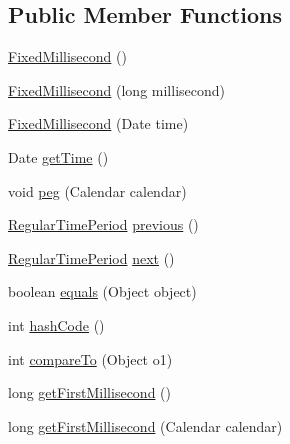 \subsection*{Public Member Functions}
\begin{DoxyCompactItemize}
\item 
\mbox{\hyperlink{classorg_1_1jfree_1_1data_1_1time_1_1_fixed_millisecond_ac6383e5e9eefae4117c7494fbae0b683}{Fixed\+Millisecond}} ()
\item 
\mbox{\hyperlink{classorg_1_1jfree_1_1data_1_1time_1_1_fixed_millisecond_a257d2702a0405b699a03fb473f376368}{Fixed\+Millisecond}} (long millisecond)
\item 
\mbox{\hyperlink{classorg_1_1jfree_1_1data_1_1time_1_1_fixed_millisecond_a495efb60f07c2761879dbc673e6a39ee}{Fixed\+Millisecond}} (Date time)
\item 
Date \mbox{\hyperlink{classorg_1_1jfree_1_1data_1_1time_1_1_fixed_millisecond_ab90c14e18854d7d1ea40db4fa6e84e42}{get\+Time}} ()
\item 
void \mbox{\hyperlink{classorg_1_1jfree_1_1data_1_1time_1_1_fixed_millisecond_a029f40d75617f862fdb9af8da5698fa3}{peg}} (Calendar calendar)
\item 
\mbox{\hyperlink{classorg_1_1jfree_1_1data_1_1time_1_1_regular_time_period}{Regular\+Time\+Period}} \mbox{\hyperlink{classorg_1_1jfree_1_1data_1_1time_1_1_fixed_millisecond_a39a4a14f44468b325929061c832a3844}{previous}} ()
\item 
\mbox{\hyperlink{classorg_1_1jfree_1_1data_1_1time_1_1_regular_time_period}{Regular\+Time\+Period}} \mbox{\hyperlink{classorg_1_1jfree_1_1data_1_1time_1_1_fixed_millisecond_aec64e9f66703fd7b99571bec02c58ea9}{next}} ()
\item 
boolean \mbox{\hyperlink{classorg_1_1jfree_1_1data_1_1time_1_1_fixed_millisecond_a9573618685317b1a084ff79c0a44d627}{equals}} (Object object)
\item 
int \mbox{\hyperlink{classorg_1_1jfree_1_1data_1_1time_1_1_fixed_millisecond_a3e46c88e31481a4a781e7f9529a85d11}{hash\+Code}} ()
\item 
int \mbox{\hyperlink{classorg_1_1jfree_1_1data_1_1time_1_1_fixed_millisecond_a8f2ab182b9d754aee851e4cf9616e6d0}{compare\+To}} (Object o1)
\item 
long \mbox{\hyperlink{classorg_1_1jfree_1_1data_1_1time_1_1_fixed_millisecond_a39472c84ccd62330fcbbaba9b638ca5e}{get\+First\+Millisecond}} ()
\item 
long \mbox{\hyperlink{classorg_1_1jfree_1_1data_1_1time_1_1_fixed_millisecond_a26fcb538a63dfd40228da91058c4fa15}{get\+First\+Millisecond}} (Calendar calendar)

\end{DoxyCompactItemize}
